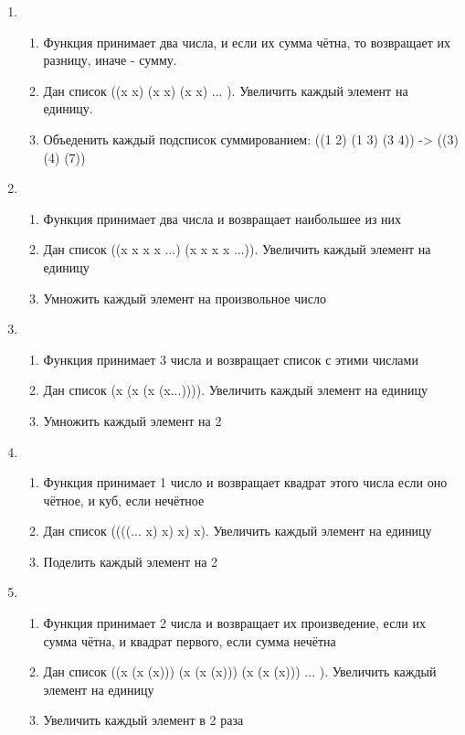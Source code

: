 \documentclass[a4paper,12pt]{article}
\begin{document}
\begin{enumerate}
	\item \begin{enumerate}
		\item Функция принимает два числа, и если их сумма чётна, то возвращает их разницу, иначе - сумму.
		\item Дан список ((x x) (x x) (x x) ... ). Увеличить каждый элемент на единицу.
		\item Объеденить каждый подсписок суммированием: ((1 2) (1 3) (3 4)) -> ((3) (4) (7))
	\end{enumerate}

	\item \begin{enumerate}
		\item Функция принимает два числа и возвращает наибольшее из них
		\item Дан список ((x x x x ...) (x x x x ...)). Увеличить каждый элемент на единицу
		\item Умножить каждый элемент на произвольное число
	\end{enumerate}

	\item \begin{enumerate}
		\item Функция принимает 3 числа и возвращает список с этими числами
		\item Дан список (x (x (x (x...)))). Увеличить каждый элемент на единицу
		\item Умножить каждый элемент на 2
	\end{enumerate}

	\item \begin{enumerate}
		\item Функция принимает 1 число и возвращает квадрат этого числа если оно чётное, и куб, если нечётное
		\item Дан список ((((... x) x) x) x). Увеличить каждый элемент на единицу
		\item Поделить каждый элемент на 2
	\end{enumerate}

	\item \begin{enumerate}
		\item Функция принимает 2 числа и возвращает их произведение, если их сумма чётна, и квадрат первого, если сумма нечётна
		\item Дан список ((x (x (x))) (x (x (x))) (x (x (x))) ... ). Увеличить каждый элемент на единицу
		\item Увеличить каждый элемент в 2 раза
	\end{enumerate}


\end{enumerate}
\end{document}

